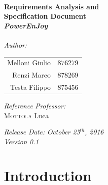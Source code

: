 \documentclass[11pt,a4paper]{report}
\begin{document}
\begin{titlepage}
\HRule \\[0.4cm]
{ \huge \bfseries Requirements Analysis and\\Specification Document\\[0.5cm]\textit{PowerEnJoy}}\\[0.4cm] %
\HRule \\[1.5cm]
 
\Large \emph{Author:}\\
\LARGE{
\begin{center}
\begin{tabular}{ r  l }
	Melloni Giulio & 876279\\
	Renzi Marco & 878269\\
	Testa Filippo & 875456 \\
\end{tabular}
\end{center}
}
\vspace*{0.8cm}
\Large{\emph{Reference Professor:} \\
{\textsc{Mottola} Luca} 
}

 \vspace*{1cm}
{\LARGE {\it Release Date: October 25$^{th}$, 2016\\Version 0.1}}

\end{titlepage}


\tableofcontents

\chapter{Introduction}
\end{document}
